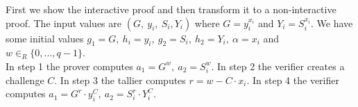 \noindent
First we show the interactive proof and then transform it to a non-interactive proof. The input values are \begin{math}(G,\ y_i,\ S_i, Y_i)\end{math} where \begin{math}G = y_i^{x_i}\end{math} and  \begin{math} Y_i=S_i^{x_i}\end{math}. We have some initial values
 \begin{math}g_1 =G,\ h_i=y_i,\ g_2=S_i,\ h_2=Y_i,\ \alpha=x_i \end{math} and \begin{math}w \in_R \{0,...,q-1\}\end{math}.\\
 
 
 
\noindent 
In step 1 the prover computes \begin{math}a_1=G^w,\ a_2=S_i^w\end{math}. In step 2
the verifier creates a challenge \begin{math}C\end{math}. In step 3 the tallier computes \begin{math}r=w-C \cdot x_i\end{math}. In step 4 the verifier computes \begin{math}a_1=G^r \cdot y_i^C,\ a_2=S_i^r \cdot Y_i^C\end{math}.
 
 
 
